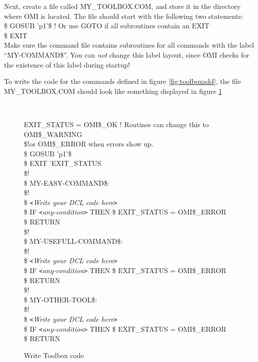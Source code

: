 \documentclass[a4paper]{book}
\newcommand{\vs}{\vspace{3mm}}
\newcommand{\lt}{\texttt{<}}
\newcommand{\gt}{\texttt{>}}
\renewcommand{\indent}{\hspace*{5mm}}
\begin{document}
Next, create a file called MY{\_}TOOLBOX.COM, and store it in the directory 
where OMI is located. The file should start with the following two 
statements: \\
\indent\textsf{{\$} GOSUB 'p1'{\$} ! Or use GOTO if all subroutines contain an EXIT} \\
\indent\textsf{{\$} EXIT} \\
Make sure the command file contains subroutines for all commands with the 
label ``MY-COMMAND{\$}''. You can \textit{not} change this label layout, since OMI checks 
for the existence of this label during startup!

\vs

To write the code for the commands defined in figure \ref{fig:toolboxadd}, the file 
\linebreak MY{\_}TOOLBOX.COM should look like something displayed in figure \ref{fig:toolboxcre}

\begin{figure}[h!tb]
\begin{minipage}[h!tb]{\textwidth}
\hrulefill \\
\begin{ttfamily}
\noindent{\$} EXIT{\_}STATUS = OMI{\$}{\_}OK ! Routines can change this to OMI{\$}{\_}WARNING \\
{\$}!\hspace{3cm}or OMI{\$}{\_}ERROR when errors show up. \\
{\$} GOSUB 'p1'{\$} \\
{\$} EXIT 'EXIT{\_}STATUS \\
{\$}! \\
{\$} MY-EASY-COMMAND{\$}: \\
{\$}! \\
{\$} \textit{\lt Write your DCL code here\gt} \\
{\$} IF \textit{\lt any-condition\gt} THEN {\$} EXIT{\_}STATUS = OMI{\$}{\_}ERROR \\
{\$} RETURN \\
{\$}! \\
{\$} MY-USEFULL-COMMAND{\$}: \\
{\$}! \\
{\$} \textit{\lt Write your DCL code here\gt} \\
{\$} IF \textit{\lt any-condition\gt} THEN {\$} EXIT{\_}STATUS = OMI{\$}{\_}ERROR \\
{\$} RETURN \\
{\$}! \\
{\$} MY-OTHER-TOOL{\$}: \\
{\$}! \\
{\$} \textit{\lt Write your DCL code here\gt} \\
{\$} IF \textit{\lt any-condition\gt} THEN {\$} EXIT{\_}STATUS = OMI{\$}{\_}ERROR \\
{\$} RETURN \\
\end{ttfamily}
\caption{Write Toolbox code}\label{fig:toolboxcre}
\hrulefill
\end{minipage}
\end{figure}
\end{document}
